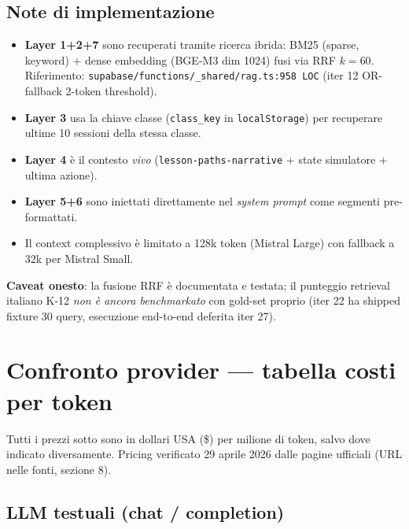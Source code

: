 \documentclass[12pt,a4paper]{article}
\begin{document}
\subsection{Note di implementazione}

\begin{itemize}[leftmargin=*]
  \item \textbf{Layer 1+2+7} sono recuperati tramite ricerca ibrida: BM25 (sparse, keyword) + dense embedding (BGE-M3 dim 1024) fusi via RRF $k=60$. Riferimento: \texttt{supabase/functions/\_shared/rag.ts:958 LOC} (iter 12 OR-fallback 2-token threshold).
  \item \textbf{Layer 3} usa la chiave classe (\texttt{class\_key} in \texttt{localStorage}) per recuperare ultime 10 sessioni della stessa classe.
  \item \textbf{Layer 4} è il contesto \emph{vivo} (\texttt{lesson-paths-narrative} + state simulatore + ultima azione).
  \item \textbf{Layer 5+6} sono iniettati direttamente nel \emph{system prompt} come segmenti pre-formattati.
  \item Il context complessivo è limitato a 128k token (Mistral Large) con fallback a 32k per Mistral Small.
\end{itemize}

\textbf{Caveat onesto}: la fusione RRF è documentata e testata; il punteggio retrieval italiano K-12 \emph{non è ancora benchmarkato} con gold-set proprio (iter 22 ha shipped fixture 30 query, esecuzione end-to-end deferita iter 27).

\newpage

\section{Confronto provider --- tabella costi per token}

Tutti i prezzi sotto sono in dollari USA (\$) per milione di token, salvo dove indicato diversamente.
Pricing verificato 29 aprile 2026 dalle pagine ufficiali (URL nelle fonti, sezione 8).

\subsection{LLM testuali (chat / completion)}
\end{document}
